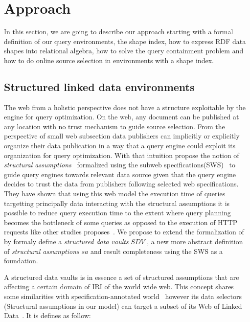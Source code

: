 \section{Approach}

In this section, we are going to describe our approach starting with a formal definition of our query environments,
the shape index, how to express RDF data shapes into relational algebra, how to solve the query containment problem
and how to do online source selection in environments with a shape index.

\subsection{Structured linked data environments}
The web from a holistic perspective does not have a structure exploitable by the engine for query optimization.
On the web, any document can be published at any location with no trust mechanism to guide source selection.
From the perspective of small web subsection data publishers can implicitly or explicitly organize their data publication in a way that a query engine could exploit 
its organization for query optimization.
With that intuition \citeauthor{Taelman2023} propose the notion of \emph{structural assumptions}~\cite{Taelman2023} formalized using the subweb specifications(SWS)~\cite{Bogaerts2021LinkTW}
to guide query engines towards relevant data source given that the query engine decides to trust the data from publishers following selected web specifications.
They have shown that using this web model the execution time of queries targetting principally data interacting with the structural assumptions it is possible to 
reduce query execution time to the extent where query planning becomes the bottleneck of some queries as opposed to the execution of HTTP requests like other studies proposes~\cite{Taelman2023, hartig2016walking}.
We propose to extend the formalization of \citeauthor{Taelman2023} by formaly define a \emph{structured data vaults} $SDV$ , a new more abstract definition of \emph{structural assumptions} $sa$ and result completeness 
using the SWS as a foundation.

A structured data vaults is in essence a set of structured assumptions that are affecting a certain domain of IRI of the world wide web.
This concept shares some similarities with specification-annotated world~\cite{Bogaerts2021LinkTW} however its data selectors (Structural assumptions in our model) can target a subset of
its Web of Linked Data~\cite{Bogaerts2021LinkTW}.
It is defines as follow:

